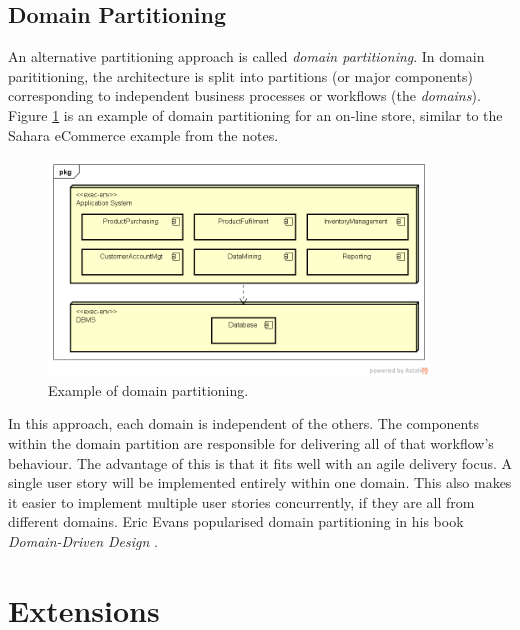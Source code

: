 \clearpage
\subsection{Domain Partitioning}
An alternative partitioning approach is called \emph{domain partitioning}.
In domain parititioning, the architecture is split into partitions (or major components)
corresponding to independent business processes or workflows (the \emph{domains}).
Figure \ref{fig:domain-partitioning} is an example of domain partitioning for an on-line store, similar to the
Sahara eCommerce example from the  notes.

\begin{figure}[h!]
    \centering
    \includegraphics[trim=38 42 19 44,clip,width=0.9\textwidth]{diagrams/domain-partitioning.png}
    \caption{Example of domain partitioning.}
    \label{fig:domain-partitioning}
\end{figure}

In this approach, each domain is independent of the others.
The components within the domain partition are responsible for delivering all of that workflow's behaviour.
The advantage of this is that it fits well with an agile delivery focus.
A single user story will be implemented entirely within one domain.
This also makes it easier to implement multiple user stories concurrently, if they are all from different domains.
Eric Evans popularised domain partitioning in his book \textit{Domain-Driven Design} \cite{ddd-evans}.



\section{Extensions}

